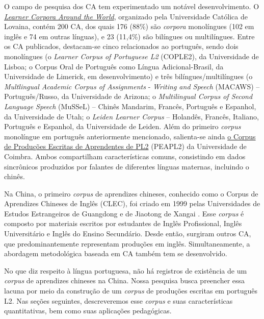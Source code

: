 \documentclass[portuguese]{textolivre}
\begin{document}
O campo de pesquisa dos CA tem experimentado um notável desenvolvimento. O \href{https://uclouvain.be/en/research-institutes/ilc/cecl/learner-corpora-around-the-world.html}{\textit{Learner Corpora Around the World}},  organizado pela Universidade Católica de Lovaina, contém 200 CA, dos quais 176 (88\%) são \textit{corpora} monolíngues (102 em inglês e 74 em outras línguas), e 23 (11,4\%) são bilíngues ou multilíngues. Entre os CA publicados, destacam-se cinco relacionados ao português, sendo dois monolíngues (o \textit{Learner Corpus of Portuguese L2} (COPLE2), da Universidade de Lisboa; o Corpus Oral de Português como Língua Adicional-Brasil, da Universidade de Limerick, em desenvolvimento) e três bilíngues/multilíngues (o \textit{Multlingual Academic Corpus of Assignments} - \textit{Writing and Speech} (MACAWS) – Português/Russo, da Universidade de Arizona; o \textit{Multilingual Corpus of Second Language Speech} (MuSSeL) – Chinês Mandarim, Francês, Português e Espanhol, da Universidade de Utah; o \textit{Leiden Learner Corpus} – Holandês, Francês, Italiano, Português e Espanhol, da Universidade de Leiden.  Além do primeiro \textit{corpus} monolíngue em português anteriormente mencionado, salienta-se ainda \href{https://teitok2.iltec.pt/peapl2/#http://teitok.iltec.pt/peapl2/}{o Corpus de Produções Escritas de Aprendentes de PL2} (PEAPL2) da Universidade de Coimbra. Ambos compartilham características comuns, consistindo em dados sincrônicos produzidos por falantes de diferentes línguas maternas, incluindo o chinês. 

Na China, o primeiro \textit{corpus} de aprendizes chineses, conhecido como o Corpus de Aprendizes Chineses de Inglês (CLEC), foi criado em 1999 pelas Universidades de Estudos Estrangeiros de Guangdong e de Jiaotong de Xangai \cite[62]{yang2001}. Esse \textit{corpus} é composto por materiais escritos por estudantes de Inglês Profissional, Inglês Universitário e Inglês do Ensino Secundário. Desde então, surgiram outros CA, que predominantemente representam produções em inglês. Simultaneamente, a abordagem metodológica baseada em CA também tem se desenvolvido.

No que diz respeito à língua portuguesa, não há registros de existência de um \textit{corpus} de aprendizes chineses na China. Nossa pesquisa busca preencher essa lacuna por meio da construção de um \textit{corpus} de produções escritas em português L2. Nas seções seguintes, descreveremos esse \textit{corpus} e suas características quantitativas, bem como suas aplicações pedagógicas.
\end{document}
